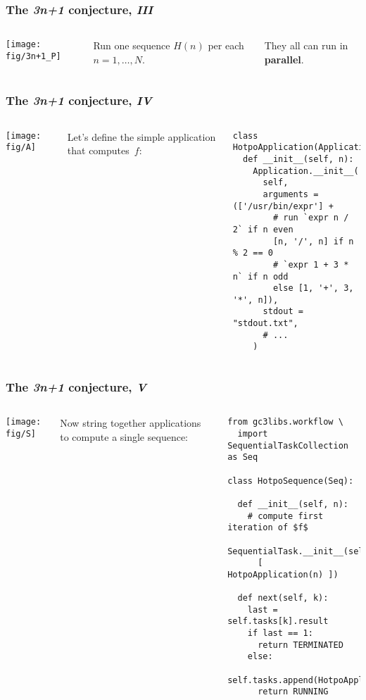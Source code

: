 \documentclass[english,serif,mathserif,xcolor=pdftex,dvipsnames,table]{beamer}
\begin{document}
\begin{frame}
  \frametitle{The \emph{3n+1} conjecture, \emph{III}}
  \label{sec:7c}

  \+
  \begin{columns}[c]
    \texttt{[image: fig/3n+1\_P]}

    Run one sequence $H(n)$ per each $n = 1, \ldots, N$.

    \+
    They all can run in \textbf{parallel}.
  \end{columns}
\end{frame}

\begin{frame}[fragile]
  \frametitle{The \emph{3n+1} conjecture, \emph{IV}}
  \label{sec:10}

  \begin{columns}
    \begin{center}
      \texttt{[image: fig/A]}
    \end{center}

    Let's define the simple application that computes~$f$:
    \begin{lstlisting}
class HotpoApplication(Application):
  def __init__(self, n):
    Application.__init__(
      self,
      arguments = (['/usr/bin/expr'] +
        # run `expr n / 2` if n even
        [n, '/', n] if n % 2 == 0
        # `expr 1 + 3 * n` if n odd
        else [1, '+', 3, '*', n]),
      stdout = "stdout.txt",
      # ...
    )
    \end{lstlisting}
  \end{columns}
\end{frame}

\begin{frame}[fragile]
  \frametitle{The \emph{3n+1} conjecture, \emph{V}}
  \label{sec:14}

  \begin{columns}
    \begin{center}
      \texttt{[image: fig/S]}
    \end{center}

    \small
    Now string together applications to compute a
    single sequence:
    \begin{lstlisting}[basicstyle=\ttfamily\footnotesize]
from gc3libs.workflow \
  import SequentialTaskCollection as Seq

class HotpoSequence(Seq):

  def __init__(self, n):
    # compute first iteration of $f$
    SequentialTask.__init__(self,
      [ HotpoApplication(n) ])
  
  def next(self, k):
    last = self.tasks[k].result
    if last == 1:
      return TERMINATED
    else:
      self.tasks.append(HotpoApplication(last))
      return RUNNING
    \end{lstlisting}
  \end{columns}
\end{frame}
\end{document}
